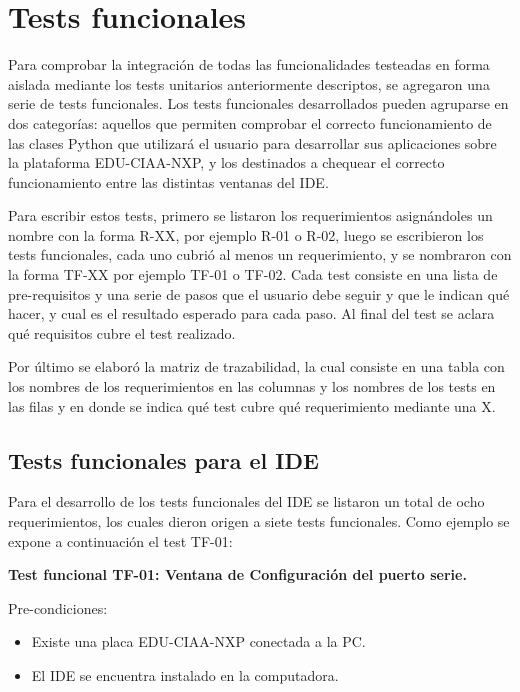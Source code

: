\section{Tests funcionales}
\label{sec:testFuncionales}

Para comprobar la integración de todas las funcionalidades testeadas en forma aislada mediante los tests unitarios anteriormente descriptos, se agregaron una serie de tests funcionales. Los tests funcionales desarrollados pueden agruparse en dos categorías: aquellos que permiten comprobar el correcto funcionamiento de las clases Python que utilizará el usuario para desarrollar sus aplicaciones sobre la plataforma EDU-CIAA-NXP, y los destinados a chequear el correcto funcionamiento entre las distintas ventanas del IDE.

Para escribir estos tests, primero se listaron los requerimientos asignándoles un nombre con la forma R-XX, por ejemplo R-01 o R-02, luego se escribieron los tests funcionales, cada uno cubrió al menos un requerimiento, y se nombraron con la forma TF-XX por ejemplo TF-01 o TF-02. Cada test consiste en una lista de pre-requisitos y una serie de pasos que el usuario debe seguir y que le indican qué hacer, y cual es el resultado esperado para cada paso. Al final del test se aclara qué requisitos cubre el test realizado.

Por último se elaboró la matriz de trazabilidad, la cual consiste en una tabla con los nombres de los requerimientos en las columnas y los nombres de los tests en las filas y en donde se indica qué test cubre qué requerimiento mediante una X.


\subsection{Tests funcionales para el IDE}

Para el desarrollo de los tests funcionales del IDE se listaron un total de ocho requerimientos, los cuales dieron origen a siete tests funcionales. Como ejemplo se expone a continuación el test TF-01:

\textbf{Test funcional TF-01: Ventana de Configuración del puerto serie.}

Pre-condiciones:
\begin{itemize}
	\item Existe una placa EDU-CIAA-NXP conectada a la PC.
	\item El IDE se encuentra instalado en la computadora.
\end{itemize}

